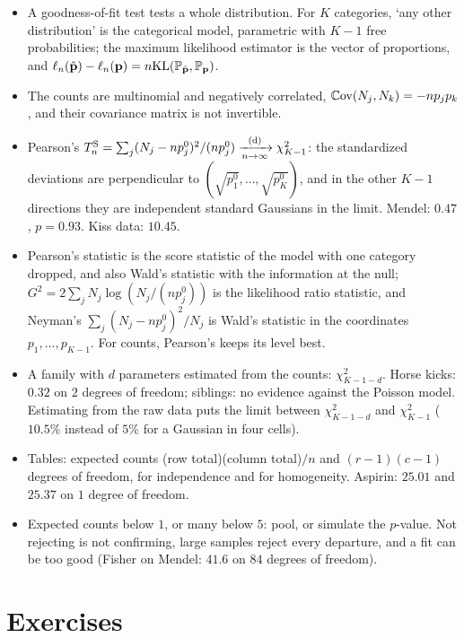 \begin{itemize}[nosep]
\item A goodness-of-fit test tests a whole distribution. For $K$ categories, `any other distribution' is the categorical model, parametric with $K - 1$ free probabilities; the maximum likelihood estimator is the vector of proportions, and $\ell_n(\hat{\mathbf{p}}) - \ell_n(\mathbf{p}) = n\mathrm{KL}(\mathbb{P}_{\hat{\mathbf{p}}}, \mathbb{P}_{\mathbf{p}})$.
\item The counts are multinomial and negatively correlated, $\operatorname*{\mathbb{C}\text{ov}}(N_j, N_k) = -np_jp_k$, and their covariance matrix is not invertible.
\item Pearson's $T^{\mathrm{S}}_n = \sum_j(N_j - np^0_j)^2/(np^0_j) \xrightarrow [n \to \infty ]{\text{(d)}} \chi^2_{K-1}$: the standardized deviations are perpendicular to $(\sqrt{p^0_1}, \ldots, \sqrt{p^0_K})$, and in the other $K - 1$ directions they are independent standard Gaussians in the limit. Mendel: $0.47$, $p = 0.93$. Kiss data: $10.45$.
\item Pearson's statistic is the score statistic of the model with one category dropped, and also Wald's statistic with the information at the null; $G^2 = 2\sum_jN_j\log(N_j/(np^0_j))$ is the likelihood ratio statistic, and Neyman's $\sum_j(N_j - np^0_j)^2/N_j$ is Wald's statistic in the coordinates $p_1, \ldots, p_{K-1}$. For counts, Pearson's keeps its level best.
\item A family with $d$ parameters estimated from the counts: $\chi^2_{K-1-d}$. Horse kicks: $0.32$ on $2$ degrees of freedom; siblings: no evidence against the Poisson model. Estimating from the raw data puts the limit between $\chi^2_{K-1-d}$ and $\chi^2_{K-1}$ ($10.5\%$ instead of $5\%$ for a Gaussian in four cells).
\item Tables: expected counts (row total)(column total)$/n$ and $(r - 1)(c - 1)$ degrees of freedom, for independence and for homogeneity. Aspirin: $25.01$ and $25.37$ on $1$ degree of freedom.
\item Expected counts below $1$, or many below $5$: pool, or simulate the $p$-value. Not rejecting is not confirming, large samples reject every departure, and a fit can be too good (Fisher on Mendel: $41.6$ on $84$ degrees of freedom).
\end{itemize}

\section{Exercises}
\label{sec:gof-exercises}

